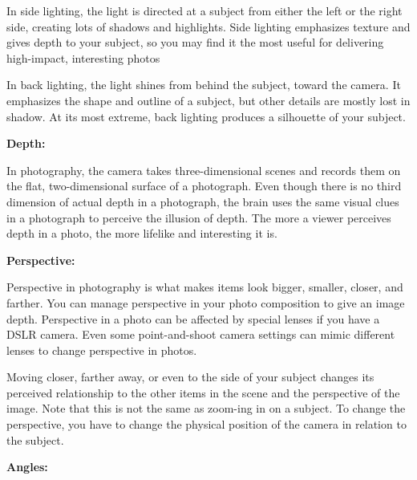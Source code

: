 \documentclass{report}
\begin{document}
    \bigbreak \noindent 
    In side lighting, the light is directed at a subject from either the left or the right side, creating lots of shadows and highlights. Side lighting emphasizes texture and gives depth to your subject, so you may find it the most useful for delivering high-impact, interesting photos

    \bigbreak \noindent 
    In back lighting, the light shines from behind the subject, toward the camera. It emphasizes the shape and outline of a subject, but other details are mostly lost in shadow. At its most extreme, back lighting produces a silhouette of your subject.

    \bigbreak \noindent \bigbreak \noindent 
    \begin{Large}
        \textbf{Depth:}
    \end{Large}

    \bigbreak \noindent 
    In photography, the camera takes three-dimensional scenes and records them on the flat, two-dimensional surface of a photograph. Even though there is no third dimension of actual depth in a photograph, the brain uses the same visual clues in a photograph to perceive the illusion of depth. The more a viewer perceives depth in a photo, the more lifelike and interesting it is.

    \bigbreak \noindent \bigbreak \noindent 
    \begin{Large}
        \textbf{Perspective:}
    \end{Large}

    \bigbreak \noindent 
    Perspective in photography is what makes items look bigger, smaller, closer, and farther. You can manage perspective in your photo composition to give an image depth. Perspective in a photo can be affected by special lenses if you have a DSLR camera. Even some point-and-shoot camera settings can mimic different lenses to change perspective in photos.

    \bigbreak \noindent 
    Moving closer, farther away, or even to the side of your subject changes its perceived relationship to the other items in the scene and the perspective of the image. Note that this is not the same as zoom-ing in on a subject. To change the perspective, you have to change the physical position of the camera in relation to the subject.

    \bigbreak \noindent \bigbreak \noindent 
    \begin{Large}
        \textbf{Angles:}
    \end{Large}
\end{document}

